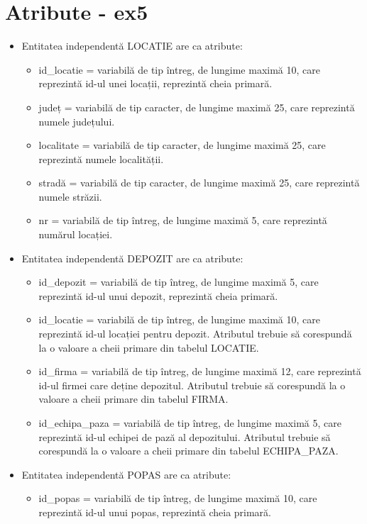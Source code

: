 \documentclass[12pt, a4paper]{article}
\begin{document}
\section{Atribute - ex5}
\begin{itemize}
    \item Entitatea independentă LOCATIE are ca atribute:
        \begin{itemize}
            \item id\_locatie = variabilă de tip întreg, de lungime maximă 10, care reprezintă id-ul unei locații, reprezintă cheia primară.
            \item județ = variabilă de tip caracter, de lungime maximă 25, care reprezintă numele județului.
            \item localitate = variabilă de tip caracter, de lungime maximă 25, care reprezintă numele localității.
            \item stradă = variabilă de tip caracter, de lungime maximă 25, care reprezintă numele străzii.
            \item nr = variabilă de tip întreg, de lungime maximă 5, care reprezintă numărul locației.
        \end{itemize}
    \item Entitatea independentă DEPOZIT are ca atribute:
        \begin{itemize}
            \item id\_depozit = variabilă de tip întreg, de lungime maximă 5, care reprezintă id-ul unui depozit, reprezintă cheia primară.
            \item id\_locatie = variabilă de tip întreg, de lungime maximă 10, care reprezintă id-ul locației pentru depozit. Atributul trebuie să corespundă la o valoare a cheii primare din tabelul LOCATIE.
            \item id\_firma = variabilă de tip întreg, de lungime maximă 12, care reprezintă id-ul firmei care deține depozitul. Atributul trebuie să corespundă la o valoare a cheii primare din tabelul FIRMA.
            \item id\_echipa\_paza = variabilă de tip întreg, de lungime maximă 5, care reprezintă id-ul echipei de pază al depozitului. Atributul trebuie să corespundă la o valoare a cheii primare din tabelul ECHIPA\_PAZA.
        \end{itemize}
    \item Entitatea independentă POPAS are ca atribute:
        \begin{itemize}
            \item id\_popas = variabilă de tip întreg, de lungime maximă 10, care reprezintă id-ul unui popas, reprezintă cheia primară.

\end{itemize}
\end{itemize}
\end{document}
